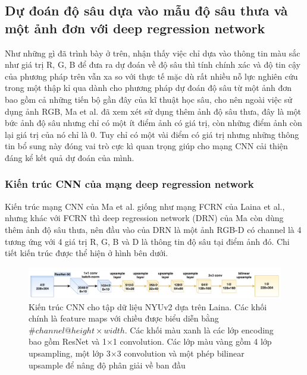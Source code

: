 \subsection{Dự đoán độ sâu dựa vào mẫu độ sâu thưa và một ảnh đơn với deep regression network}
Như những gì đã trình bày ở trên, nhận thấy việc chỉ dựa vào thông tin màu sắc như giá trị R, G, B để đưa ra dự đoán về độ sâu thì tính chính xác và độ tin cậy của phương pháp trên vẫn xa so với thực tế mặc dù rất nhiều nỗ lực nghiên cứu trong một thập kỉ qua dành cho phương pháp dự đoán độ sâu từ một ảnh đơn bao gồm cả những tiến bộ gần đây của kĩ thuật học sâu, cho nên ngoài việc sử dụng ảnh RGB, Ma et al.\cite{Ma2017SparseToDense} đã xem xét sử dụng thêm ảnh độ sâu thưa, đây là một bức ảnh độ sâu nhưng chỉ có một ít điểm ảnh có giá trị, còn những điểm ảnh còn lại giá trị của nó chỉ là 0. Tuy chỉ có một vài điểm có giá trị nhưng những thông tin bổ sung này đóng vai trò cực kì quan trọng giúp cho mạng CNN cải thiện đáng kể kết quả dự đoán của mình.
\subsubsection{Kiến trúc CNN của mạng deep regression network}
Kiến trúc mạng CNN của Ma et al.\cite{Ma2017SparseToDense} giống như mạng FCRN của Laina et al.\cite{laina2016deeper}, nhưng khác với FCRN thì deep regression network (DRN) của Ma còn dùng thêm ảnh độ sâu thưa, nên đầu vào của DRN là một ảnh RGB-D có channel là 4 tương ứng với 4 giá trị R, G, B và D là thông tin độ sâu tại điểm ảnh đó. Chi tiết kiến trúc được thể hiện ở hình bên dưới.
\begin{center}
         \begin{figure}[H]
         \begin{center}
           \includegraphics[scale=0.28]{image/Manet}
          \end{center}
          \caption{Kiến trúc CNN cho tập dữ liệu NYUv2 dựa trên Laina\cite{laina2016deeper}. Các khối chính là feature maps với chiều được biểu diễn bằng $\#channel@height\times width$. Các khối màu xanh là các lớp encoding bao gồm ResNet\cite{KHe2015} và 1$\times$1 convolution. Các lớp màu vàng gồm 4 lớp upsampling, một lớp 3$\times$3 convolution và một phép bilinear upsample để nâng độ phân giải về ban đầu}
          \label{ref_sigmoid}
          \end{figure}
 \end{center}

